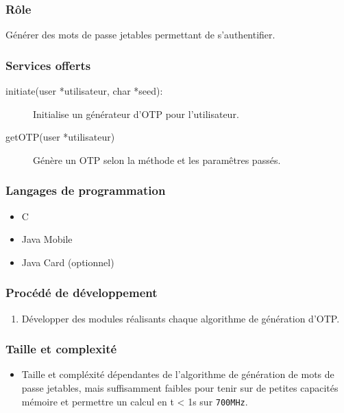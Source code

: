 \documentclass{"../../res/univ-projet"}
\begin{document}
    \subsubsection{Rôle}
        Générer des mots de passe jetables permettant de s'authentifier.

    \subsubsection{Services offerts}
    \begin{description}
        \item[initiate(user *utilisateur, char *seed):] Initialise
            un générateur d'OTP pour l'utilisateur.
        \item[getOTP(user *utilisateur)] Génère un OTP selon la méthode et les
            paramêtres passés.
    \end{description}

    \subsubsection{Langages de programmation}
    \begin{itemize}
        \item C
        \item Java Mobile
        \item Java Card (optionnel)
    \end{itemize}

    \subsubsection{Procédé de développement}
    \begin{enumerate}
        \item Développer des modules réalisants chaque algorithme de génération
            d'OTP.
    \end{enumerate}

    \subsubsection{Taille et complexité}
    \begin{itemize}
        \item Taille et compléxité dépendantes de l'algorithme de génération
            de mots de passe jetables, mais suffisamment faibles pour tenir sur
            de petites capacités mémoire et permettre un calcul 
            en t < 1s sur \verb?700MHz?.
    \end{itemize}
\end{document}
